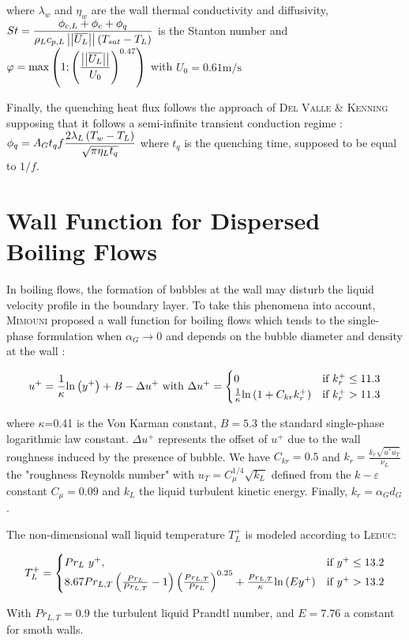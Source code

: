 where $\lambda_{w}$ and $\eta_{w}$ are the wall thermal conductivity and diffusivity, $St=\displaystyle \frac{\phi_{c,L}+\phi_{e}+\phi_{q}}{\rho_{L}c_{p,L}\left|\left|{\overline{U_{L}}}\right|\right|\left( T_{sat}-T_{L}  \right)}$ is the Stanton number and $\varphi=\displaystyle \mathrm{max}\left( 1 ; \left( \frac{\left|\left|{\overline{U_{L}}}\right|\right|}{U_{0}}  \right)^{0.47}  \right)$ with $U_{0}=0.61\text{m/s}$

Finally, the quenching heat flux follows the approach of \textsc{Del Valle} \& \textsc{Kenning}\cite{delvalle1985} supposing that it follows a semi-infinite transient conduction regime : $\displaystyle \phi_{q}=A_{G}t_{q}f\frac{2\lambda_{L} \left( T_{w}-T_{L} \right)}{\sqrt{\pi \eta_{L}t_{q}}}$ where $t_{q}$ is the quenching time, supposed to be equal to $1/f$.

\section{Wall Function for Dispersed Boiling Flows}
\label{subsec:wall_func}

In boiling flows, the formation of bubbles at the wall may disturb the liquid velocity profile in the boundary layer. To take this phenomena into account, \textsc{Mimouni} \etal\cite{mimouni2016} proposed a wall function for boiling flows which tends to the single-phase formulation when $\alpha_{G} \rightarrow 0$ and depends on the bubble diameter and density at the wall : 

\begin{equation}
\label{eq:wall_law}
u^{+}=\frac{1}{\kappa}\ln{ y^{+} } + B - \Delta u^{+} \text{ with } 
  \Delta u^{+}=\begin{cases}
    0 & \text{if $k_{r}^{+}\leq11.3$}\\
    \frac{1}{\kappa}\ln{ 1+ C_{kr}k_{r}^{+} } & \text{\text{if $k_{r}^{+}>11.3$}}
  \end{cases}
\end{equation}

where $\kappa$=0.41 is the Von Karman constant, $B=5.3$ the standard single-phase logarithmic law constant. $\Delta u^{+}$ represents the offset of $u^{+}$ due to the wall roughness induced by the presence of bubble. We have $C_{kr}=0.5$ and $k_{r}=\displaystyle \frac{k_{r}\sqrt{u^{*}u_{T}}}{\nu_{L}}$ the "roughness Reynolds number" with $u_{T}=C_{\mu}^{1/4}\sqrt{k_{L}}$ defined from the $k-\varepsilon$ constant $C_{\mu}=0.09$ and $k_{L}$ the liquid turbulent kinetic energy. Finally, $k_{r}=\alpha_{G}d_{G}$.

The non-dimensional wall liquid temperature $T_{L}^{+}$ is modeled according to \textsc{Leduc}\cite{leduc1995}:

\begin{equation}
\label{eq:wall_law} 
  T_{L}^{+}=\begin{cases}
    Pr_{L}~y^{+}, & \text{if $y^{+}\leq 13.2$}\\
    8.67Pr_{L,T}\parth{ \frac{Pr_{L}}{Pr_{L,T}}-1 } \parth{\frac{Pr_{L,T}}{Pr_{L}} }^{0.25} + \frac{Pr_{L,T}}{\kappa}\ln{Ey^{+}}  & \text{\text{if $y^{+}>13.2$}}
  \end{cases}
\end{equation}

With $Pr_{L,T}=0.9$ the turbulent liquid Prandtl number, and $E=7.76$ a constant for smoth walls.
